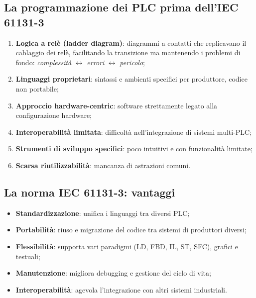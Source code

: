 \subsection{La programmazione dei PLC prima dell'IEC 61131-3}
\begin{enumerate}
    \item \textbf{Logica a relè (ladder diagram)}: diagrammi a contatti che replicavano il cablaggio dei relè, facilitando la transizione ma mantenendo i problemi di fondo: \emph{complessità} $\leftrightarrow$ \emph{errori} $\leftrightarrow$ \emph{pericolo};
    \item \textbf{Linguaggi proprietari}: sintassi e ambienti specifici per produttore, codice non portabile;
    \item \textbf{Approccio hardware-centric}: software strettamente legato alla configurazione hardware;
    \item \textbf{Interoperabilità limitata}: difficoltà nell'integrazione di sistemi multi-PLC;
    \item \textbf{Strumenti di sviluppo specifici}: poco intuitivi e con funzionalità limitate;
    \item \textbf{Scarsa riutilizzabilità}: mancanza di astrazioni comuni.
\end{enumerate}

\subsection{La norma IEC 61131-3: vantaggi}
\begin{itemize}
    \item \textbf{Standardizzazione}: unifica i linguaggi tra diversi PLC;
    \item \textbf{Portabilità}: riuso e migrazione del codice tra sistemi di produttori diversi;
    \item \textbf{Flessibilità}: supporta vari paradigmi (LD, FBD, IL, ST, SFC), grafici e testuali;
    \item \textbf{Manutenzione}: migliora debugging e gestione del ciclo di vita;
    \item \textbf{Interoperabilità}: agevola l'integrazione con altri sistemi industriali.
\end{itemize}

